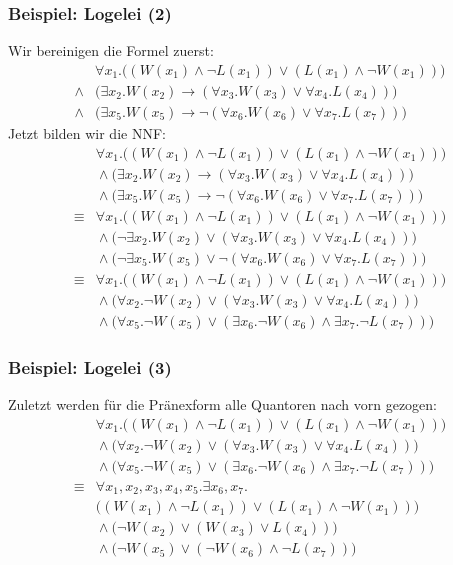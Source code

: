 \documentclass[onlymath]{beamer}
\begin{document}
\begin{frame}\frametitle{Beispiel: Logelei (2)}

Wir bereinigen die Formel zuerst:
\begin{align*}
& \forall x_1.\big((W(x_1)\wedge\neg L(x_1))\vee (L(x_1)\wedge\neg W(x_1))\big)\\
{}\wedge{} & \big(\exists x_2.W(x_2)\to(\forall x_3.W(x_3) \vee \forall x_4.L(x_4))\big) \\
{}\wedge{} & \big(\exists x_5.W(x_5)\to\neg(\forall x_6.W(x_6) \vee \forall x_7.L(x_7))\big)
\end{align*}\pause
Jetzt bilden wir die NNF:
{\footnotesize
\begin{align*}
& \forall x_1.\big((W(x_1)\wedge\neg L(x_1))\vee (L(x_1)\wedge\neg W(x_1))\big)\\
& {}\wedge{}  \big(\exists x_2.W(x_2)\to(\forall x_3.W(x_3) \vee \forall x_4.L(x_4))\big)\\
& {}\wedge{}  \big(\exists x_5.W(x_5)\to\neg(\forall x_6.W(x_6) \vee \forall x_7.L(x_7))\big)\\
%
{}\equiv{} & \forall x_1.\big((W(x_1)\wedge\neg L(x_1))\vee (L(x_1)\wedge\neg W(x_1))\big)\\
& {}\wedge{}  \big(\neg\exists x_2.W(x_2)\vee(\forall x_3.W(x_3) \vee \forall x_4.L(x_4))\big)\\
& {}\wedge{}  \big(\neg\exists x_5.W(x_5)\vee\neg(\forall x_6.W(x_6) \vee \forall x_7.L(x_7))\big)\\
%
{}\equiv{} & \forall x_1.\big((W(x_1)\wedge\neg L(x_1))\vee (L(x_1)\wedge\neg W(x_1))\big)\\
& {}\wedge{}  \big(\forall x_2.\neg W(x_2)\vee(\forall x_3.W(x_3) \vee \forall x_4.L(x_4))\big)\\
& {}\wedge{}  \big(\forall x_5.\neg W(x_5)\vee(\exists x_6.\neg W(x_6) \wedge \exists x_7.\neg L(x_7))\big)
\end{align*}
}


\end{frame}

\begin{frame}\frametitle{Beispiel: Logelei (3)}

Zuletzt werden für die Pränexform alle Quantoren nach vorn gezogen:
\begin{align*}
& \forall x_1.\big((W(x_1)\wedge\neg L(x_1))\vee (L(x_1)\wedge\neg W(x_1))\big)\\
& {}\wedge{}  \big(\forall x_2.\neg W(x_2)\vee(\forall x_3.W(x_3) \vee \forall x_4.L(x_4))\big)\\
& {}\wedge{}  \big(\forall x_5.\neg W(x_5)\vee(\exists x_6.\neg W(x_6) \wedge \exists x_7.\neg L(x_7))\big)\\
{}\equiv{} & \forall x_1,x_2,x_3,x_4,x_5.\exists x_6,x_7.\\
& \big((W(x_1)\wedge\neg L(x_1))\vee (L(x_1)\wedge\neg W(x_1))\big)\\
& {}\wedge{}  \big(\neg W(x_2)\vee(W(x_3) \vee L(x_4))\big)\\
& {}\wedge{}  \big(\neg W(x_5)\vee(\neg W(x_6) \wedge \neg L(x_7))\big)
\end{align*}


\end{frame}
\end{document}
